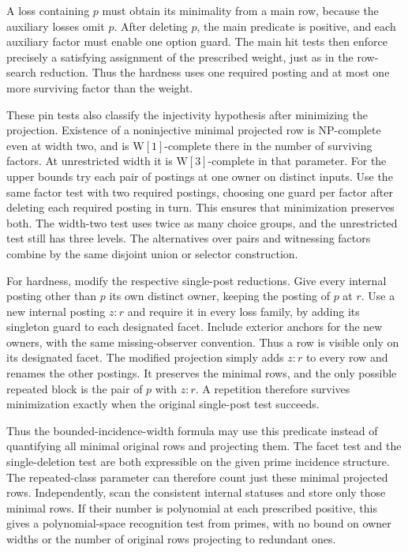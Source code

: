 A loss containing $p$ must obtain its
minimality from a main row, because the
auxiliary losses omit $p$. After deleting
$p$, the main predicate is positive, and
each auxiliary factor must enable one
option guard. The main hit tests then
enforce precisely a satisfying assignment
of the prescribed weight, just as in the
row-search reduction. Thus the hardness
uses one required posting and at most one
more surviving factor than the weight.

These pin tests also classify the injectivity
hypothesis after minimizing the projection.
Existence of a noninjective minimal projected
row is NP-complete even at width two, and is
$\mathrm W[1]$-complete there in the number
of surviving factors. At unrestricted width it
is $\mathrm W[3]$-complete in that parameter.
For the upper bounds try each pair of postings
at one owner on distinct inputs. Use the same
factor test with two required postings, choosing
one guard per factor after deleting each required
posting in turn. This ensures that minimization
preserves both. The width-two test uses twice as
many choice groups, and the unrestricted test
still has three levels. The alternatives over
pairs and witnessing factors combine by the same
disjoint union or selector construction.

For hardness, modify the respective single-post
reductions. Give every internal posting other
than $p$ its own distinct owner, keeping the
posting of $p$ at $r$. Use a new internal
posting $z{:}r$ and require it in every loss
family, by adding its singleton guard to each
designated facet. Include exterior anchors for
the new owners, with the same missing-observer
convention. Thus a row is visible only on its
designated facet. The modified projection simply
adds $z{:}r$ to every row and renames the other
postings. It preserves the minimal rows, and
the only possible repeated block is the pair
of $p$ with $z{:}r$. A repetition therefore
survives minimization exactly when the original
single-post test succeeds.

Thus the bounded-incidence-width formula may use
this predicate instead of quantifying all minimal
original rows and projecting them. The facet test
and the single-deletion test are both expressible
on the given prime incidence structure. The
repeated-class parameter can therefore count just
these minimal projected rows. Independently, scan
the consistent internal statuses and store only
those minimal rows. If their number is polynomial
at each prescribed positive, this gives a
polynomial-space recognition test from primes,
with no bound on owner widths or the number of
original rows projecting to redundant ones.

